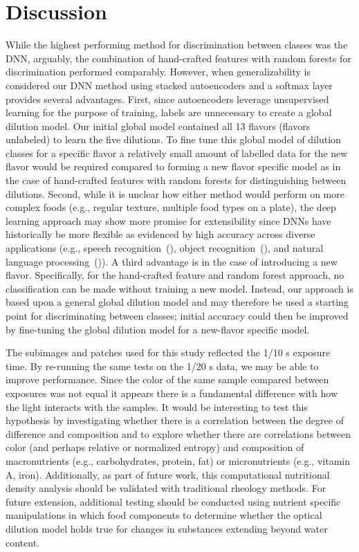\documentclass[authoryear]{elsarticle}
\begin{document}
\section{Discussion}
\label{sec:Discussion}
While the highest performing method for discrimination between classes was the DNN, arguably, the combination of hand-crafted features with random forests for discrimination performed comparably. However, when generalizability is considered our DNN method using stacked autoencoders and a softmax layer provides several advantages. First, since autoencoders leverage unsupervised learning for the purpose of training, labels are unnecessary to create a global dilution model. Our initial global model contained all 13 flavors (flavors unlabeled) to learn the five dilutions. To fine tune this global model of dilution classes for a specific flavor a relatively small amount of labelled data for the new flavor would be required compared to forming a new flavor specific model as in the case of hand-crafted features with random forests for distinguishing between dilutions. Second, while it is unclear how either method would perform on more complex foods (e.g., regular texture, multiple food types on a plate), the deep learning approach may show more promise for extensibility since DNNs have historically be more flexible as evidenced by high accuracy across diverse applications (e.g., speech recognition~(\cite{hinton2012, dahl2012, hannun2014}), object recognition~(\cite{krizhevsky2012, he2015, lecun2004, simonyan2014}), and natural language processing~(\cite{bengio2003, collobert2008})). A third advantage is in the case of introducing a new flavor. Specifically, for the hand-crafted feature and random forest approach, no classification can be made without training a new model. Instead, our approach is based upon a general global dilution model and may therefore be used a starting point for discriminating between classes; initial accuracy could then be improved by fine-tuning the global dilution model for a new-flavor specific model.

The subimages and patches used for this study reflected the 1/10 s exposure time. By re-running the same tests on the 1/20 s data, we may be able to improve performance. Since the color of the same sample compared between exposures was not equal it appears there is a fundamental difference with how the light interacts with the samples. It would be interesting to test this hypothesis by investigating whether there is a correlation between the degree of difference and composition and to explore whether there are correlations between color (and perhaps relative or normalized entropy) and composition of macronutrients (e.g., carbohydrates, protein, fat) or micronutrients (e.g., vitamin A, iron). Additionally, as part of future work, this computational nutritional density analysis should be validated with traditional rheology methods. For future extension, additional testing should be conducted using nutrient specific manipulations in which food components to determine whether the optical dilution model holds true for changes in substances extending beyond water content.
\end{document}
